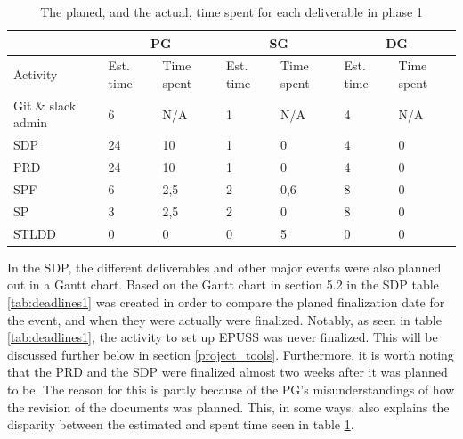 \documentclass{article}
\begin{document}
\begin{table}[h!]
    \centering
    \begin{tabular}{l|l|l|l|l|l|l|}
    \cline{2-7}
    & \multicolumn{2}{c|}{PG} & \multicolumn{2}{c|}{SG} & \multicolumn{2}{c|}{DG} \\ \hline
    \multicolumn{1}{|l|}{Activity} & Est. time & Time spent &  Est. time & Time spent & Est. time & Time spent        \\ \hline
    \multicolumn{1}{|l|}{Git \& slack admin} & 6 & N/A & 1 & N/A  & 4 & N/A\\ \hline
    \multicolumn{1}{|l|}{SDP} & 24 & 10 & 1 & 0 & 4 & 0 \\ \hline
    \multicolumn{1}{|l|}{PRD} & 24 & 10 & 1 & 0 & 4 & 0 \\ \hline
    \multicolumn{1}{|l|}{SPF} & 6 & 2,5 & 2 & 0,6 & 8 & 0\\ \hline
    \multicolumn{1}{|l|}{SP} & 3 & 2,5 & 2 & 0 & 8 & 0 \\ \hline
    \multicolumn{1}{|l|}{STLDD} & 0 & 0 & 0 & 5 & 0 & 0 \\ \hline
\end{tabular}
\caption{The planed, and the actual, time spent for each deliverable in phase 1}
\label{tab:timeSpent1}
\end{table}

In the SDP, the different deliverables and other major events were also planned out in a Gantt chart. Based on the Gantt chart in section 5.2 in the SDP \cite{SDP} table \ref{tab:deadlines1} was created in order to compare the planed finalization date for the event, and when they were actually were finalized. Notably, as seen in table \ref{tab:deadlines1}, the activity to set up EPUSS was never finalized. This will be discussed further below in section \ref{project_tools}. Furthermore, it is worth noting that the PRD and the SDP were finalized almost two weeks after it was planned to be. The reason for this is partly because of the PG's misunderstandings of how the revision of the documents was planned. This, in some ways, also explains the disparity between the estimated and spent time seen in table \ref{tab:timeSpent1}.
\end{document}
